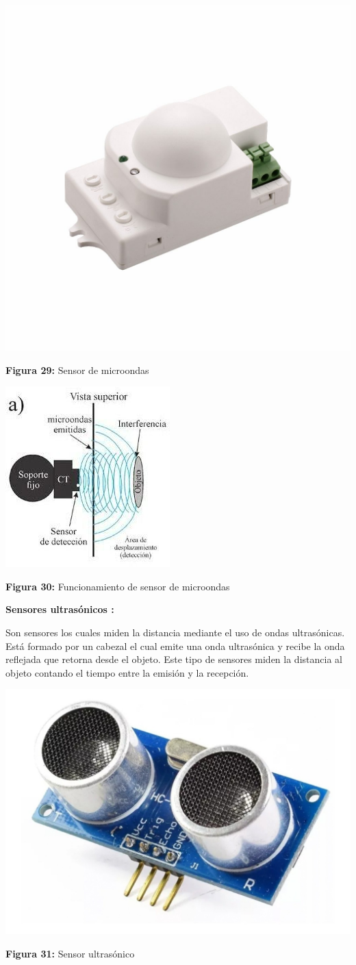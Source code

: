 \begin{center}
	\includegraphics[width=0.4\linewidth, height=0.2\textwidth]{img/microondas}
	
	\vspace{2mm} %
	
	\textbf{Figura 29:} Sensor de microondas
\end{center}

\vspace{5mm} %

\begin{center}
	\includegraphics[width=0.4\linewidth]{img/Smicroondas}
	
	\vspace{2mm} %
	
	\textbf{Figura 30:} Funcionamiento de sensor de microondas
\end{center}


\vspace{10mm}
\textbf{Sensores ultrasónicos : }

Son sensores los cuales miden la distancia mediante el uso de ondas ultrasónicas. Está formado por un cabezal el cual emite una onda ultrasónica y recibe la onda reflejada que retorna desde el objeto. Este tipo de sensores miden la distancia al objeto  contando el tiempo entre la emisión y la recepción. 


\vspace{5mm}

\begin{center}
	\includegraphics[width=0.4\linewidth, height=0.2\textwidth]{img/ultrasonido}
	
	\vspace{2mm} %
	
	\textbf{Figura 31:} Sensor ultrasónico
\end{center}


